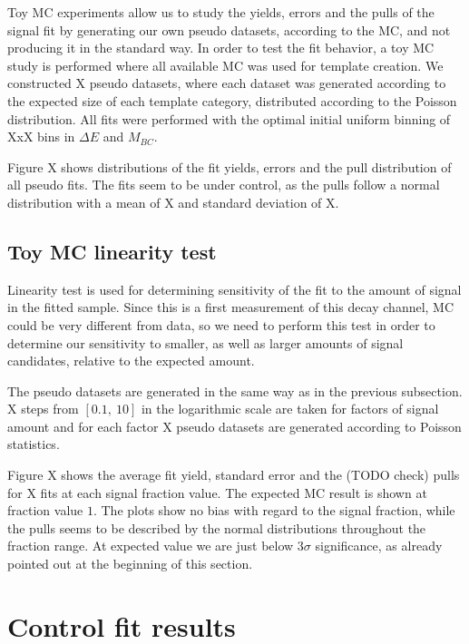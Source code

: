 \documentclass[  headings=standardclasses,
  headings=big,oneside,a4paper,openany,12pt]{scrbook}
\begin{document}
Toy MC experiments allow us to study the yields, errors and the pulls of the signal fit by generating our own pseudo datasets, according to the MC, and not producing it in the standard way. In order to test the fit behavior, a toy MC study is performed where all available MC was used for template creation. We constructed X pseudo datasets, where each dataset was generated according to the expected size of each template category, distributed according to the Poisson distribution. All fits were performed with the optimal initial uniform binning of XxX bins in $\Delta E$ and $M_{BC}$.

Figure X shows distributions of the fit yields, errors and the pull distribution of all pseudo fits. The fits seem to be under control, as the pulls follow a normal distribution with a mean of X and standard deviation of X.

\subsection{Toy MC linearity test}
Linearity test is used for determining sensitivity of the fit to the amount of signal in the fitted sample. Since this is a first measurement of this decay channel, MC could be very different from data, so we need to perform this test in order to determine our sensitivity to smaller, as well as larger amounts of signal candidates, relative to the expected amount.

The pseudo datasets are generated in the same way as in the previous subsection. X steps from $[0.1,~10]$ in the logarithmic scale are taken for factors of signal amount and for each factor X pseudo datasets are generated according to Poisson statistics.

Figure X shows the average fit yield, standard error and the (TODO check) pulls for X fits at each signal fraction value. The expected MC result is shown at fraction value $1$. The plots show no bias with regard to the signal fraction, while the pulls seems to be described by the normal distributions throughout the fraction range. At expected value we are just below $3\sigma$ significance, as already pointed out at the beginning of this section.

\section{Control fit results}
\end{document}
